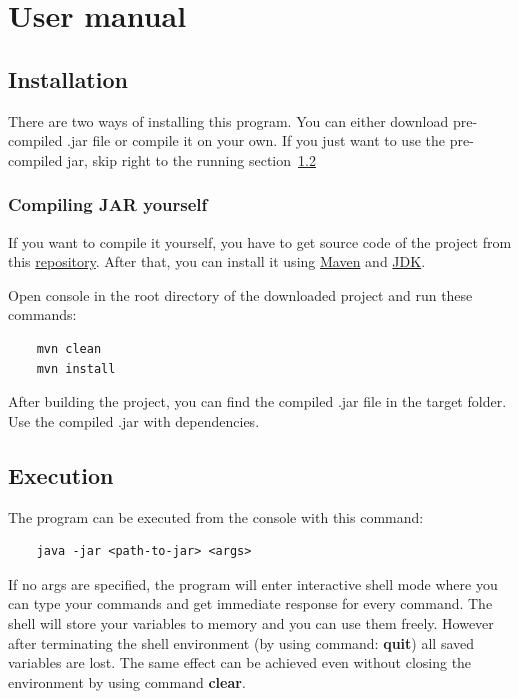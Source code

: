 \documentclass{ctuthesis}
\begin{document}
\chapter{User manual}
\section{Installation}
There are two ways of installing this program. You can either download pre-compiled .jar file or compile it on your own. If you just want to use the pre-compiled jar, skip right to the running section~\ref{sec:execution}

\subsection{Compiling JAR yourself}
If you want to compile it yourself, you have to get source code of the project from this \href{https://github.com/horovtom/jautomata}{repository}. After that, you can install it using \href{https://maven.apache.org/}{Maven} and \href{https://www.oracle.com/technetwork/java/javase/downloads/jdk8-downloads-2133151.html}{JDK}. %

Open console in the root directory of the downloaded project and run these commands:
\begin{verbatim}
	mvn clean
	mvn install
\end{verbatim}

After building the project, you can find the compiled .jar file in the target folder. Use the compiled .jar with dependencies.

\section{Execution}
\label{sec:execution}
The program can be executed from the console with this command:

\begin{verbatim}
	java -jar <path-to-jar> <args>
\end{verbatim}

If no args are specified, the program will enter interactive shell mode where you can type your commands and get immediate response for every command. The shell will store your variables to memory and you can use them freely. However after terminating the shell environment (by using command: \textbf{quit}) all saved variables are lost. The same effect can be achieved even without closing the environment by using command \textbf{clear}. 
\end{document}

